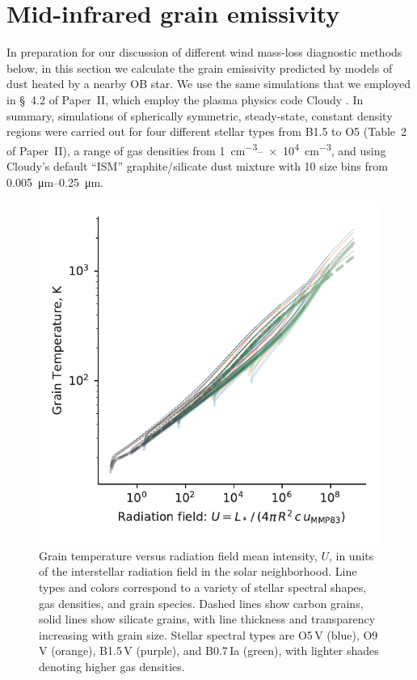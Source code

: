 \section{Mid-infrared grain emissivity}
\label{sec:grain-temp-emiss}

In preparation for our discussion of different wind mass-loss
diagnostic methods below, in this section we calculate the grain
emissivity predicted by models of dust heated by a nearby OB star.  We
use the same simulations that we employed in \S~4.2 of Paper~II,
which employ the plasma physics code Cloudy \citep{Ferland:2013a,
  Ferland:2017a}.  In summary, simulations of spherically symmetric,
steady-state, constant density \hii{} regions were carried out for
four different stellar types from B1.5 to O5 (Table~2 of Paper~II), a
range of gas densities from \SIrange{1}{e4}{cm^{-3}}, and using
Cloudy's default ``ISM'' graphite/silicate dust mixture with 10 size
bins from \SIrange{0.005}{0.25}{\um}.  

\begin{figure}
  \centering
  \includegraphics[width=\linewidth]{figs/grain-T-vs-U}
  \caption{Grain temperature versus radiation field mean intensity,
    \(U\), in units of the interstellar radiation field in the solar
    neighborhood.  Line types and colors correspond to a variety of
    stellar spectral shapes, gas densities, and grain species.  Dashed
    lines show carbon grains, solid lines show silicate grains, with
    line thickness and transparency increasing with grain size.
    Stellar spectral types are O5\,V (blue), O9\,V (orange), B1.5\,V
    (purple), and B0.7\,Ia (green), with lighter shades denoting
    higher gas densities. }
  \label{fig:grain-T-vs-U}
\end{figure}

